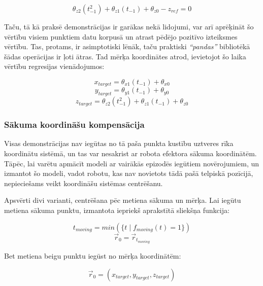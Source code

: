 \documentclass[12pt, a4paper]{article}
\numberwithin{equation}{section} %
\begin{document}
\begin{equation}
    \theta_{z2}(t_{-1}^2) + \theta_{z1}(t_{-1}) + \theta_{z0} - z_{ref} = 0
\end{equation}

Taču, tā kā praksē demonstrācijas ir garākas nekā lidojumi, var arī aprēķināt šo vērtību visiem punktiem datu korpusā un atrast pēdējo pozitīvo izteiksmes vērtību. Tas, protams, ir asimptotiski lēnāk, taču praktiski \textit{``pandas''} bibliotēkā šādas operācijas ir ļoti ātras. Tad mērķa koordinātes atrod, ievietojot šo laika vērtību regresijas vienādojumos:

\begin{equation}
    x_{target} = \theta_{x1}(t_{-1}) + \theta_{x0}
\end{equation}
\begin{equation}
    y_{target} = \theta_{y1}(t_{-1}) + \theta_{y0}
\end{equation}
\begin{equation}
    z_{target} = \theta_{z2}(t_{-1}^2) + \theta_{z1}(t_{-1}) + \theta_{z0}
\end{equation}

\subsubsection{Sākuma koordināšu kompensācija}

Visas demonstrācijas nav iegūtas no tā paša punkta kustību uztveres rīka koordinātu sistēmā, un tas var nesakrist ar robota efektora sākuma koordinātēm. Tāpēc, lai varētu apmācīt modeli ar vairākās epizodēs iegūtiem novērojumiem, un izmantot šo modeli, vadot robotu, kas nav novietots tādā pašā telpiskā pozīcijā, nepieciešams veikt koordināšu sistēmas centrēšanu.

Apsvērti divi varianti, centrēšana pēc metiena sākuma un mērķa. Lai iegūtu metiena sākuma punktu, izmantota iepriekš aprakstītā sliekšņa funkcija:

\begin{equation}
    t_{moving} = min(\lbrace t \mid f_{moving}(t) = 1 \rbrace)
\end{equation}
\begin{equation}
    \vec{r}_{0} = \vec{r}_{t_{moving}}
\end{equation}

Bet metiena beigu punktu iegūst no mērķa koordinātēm:

\begin{equation}
    \vec{r}_{0} = ( x_{target}, y_{target}, z_{target} )
\end{equation}
\end{document}
